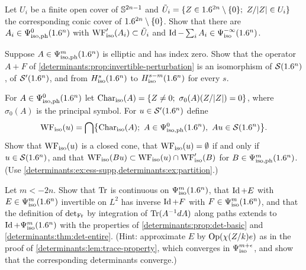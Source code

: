 \begin{exercise}\label{determinants:ex:partition}
  Let $U_i$ be a finite open cover of $\mathbb{S}^{2n-1}$ and
  $\tilde U_i=\{Z\in\R^{2n}\setminus\{0\};\ Z/\abs{Z}\in U_i\}$ the
  corresponding conic cover of $1.6^{2n}\setminus\{0\}$. Show that there are
  $A_i\in\Psi^{0}_{\mathrm{iso,ph}}(1.6^n)$ with $\operatorname{WF}_{\mathrm{iso}}'(A_i)\subset\tilde U_i$ and
  $\operatorname{Id}-\sum_iA_i\in\Psi^{-\infty}_{\mathrm{iso}}(1.6^n)$.
\end{exercise}

\begin{exercise}\label{determinants:ex:perturbation-sobolev}
  Suppose $A\in\Psi^{m}_{\mathrm{iso,ph}}(1.6^n)$ is elliptic and has index zero. Show that the
  operator $A+F$ of \cref{determinants:prop:invertible-perturbation} is an
  isomorphism of $\mathcal{S}(1.6^n)$, of $\mathcal{S}'(1.6^n)$, and from
  $H^{s}_{\mathrm{iso}}(1.6^n)$ to $H^{s-m}_{\mathrm{iso}}(1.6^n)$ for every
  $s$.
\end{exercise}

\begin{exercise}\label{determinants:ex:wf}
  For $A\in\Psi^{0}_{\mathrm{iso,ph}}(1.6^n)$ let
  $\Char_{\mathrm{iso}}(A)=\{Z\ne0;\ \sigma_0(A)(Z/\abs{Z})=0\}$, where
  $\sigma_0(A)$ is the principal symbol. For $u\in\mathcal{S}'(1.6^n)$ define
  \begin{equation*}
    \WFiso(u)=\bigcap\bigl\{\Char_{\mathrm{iso}}(A);\ A\in\Psiisoph{0}(\R^n),\ Au\in\cS(\R^n)\bigr\}.
  \end{equation*}
  Show that $\operatorname{WF}_{\mathrm{iso}}(u)$ is a closed cone, that $\operatorname{WF}_{\mathrm{iso}}(u)=\emptyset$ if and only
  if $u\in\mathcal{S}(1.6^n)$, and that $\operatorname{WF}_{\mathrm{iso}}(Bu)\subset\operatorname{WF}_{\mathrm{iso}}(u)\cap\operatorname{WF}_{\mathrm{iso}}'(B)$ for
  $B\in\Psi^{m}_{\mathrm{iso,ph}}(1.6^n)$. (Use \cref{determinants:ex:ess-supp,determinants:ex:partition}.)
\end{exercise}

\begin{exercise}\label{determinants:ex:extend}
  Let $m<-2n$. Show that $\operatorname{Tr}$ is continuous on $\Psi^{m}_{\mathrm{iso}}(1.6^n)$, that
  $\operatorname{Id}+E$ with $E\in\Psi^{m}_{\mathrm{iso}}(1.6^n)$ invertible on $L^2$ has inverse
  $\operatorname{Id}+F$ with $F\in\Psi^{m}_{\mathrm{iso}}(1.6^n)$, and that the definition of $\operatorname{det}_{\mathrm{Fr}}$
  by integration of $\operatorname{Tr}(A^{-1}dA)$ along paths extends to
  $\operatorname{Id}+\Psi^{m}_{\mathrm{iso}}(1.6^n)$ with the properties of
  \cref{determinants:prop:det-basic} and \cref{determinants:thm:det-entire}.
  (Hint: approximate $E$ by $\operatorname{Op}(\chi(Z/k)e)$ as in the proof of
  \cref{determinants:lem:trace-property}, which converges in
  $\Psi^{m+\epsilon}_{\mathrm{iso}}$, and show that the corresponding determinants converge.)
\end{exercise}

